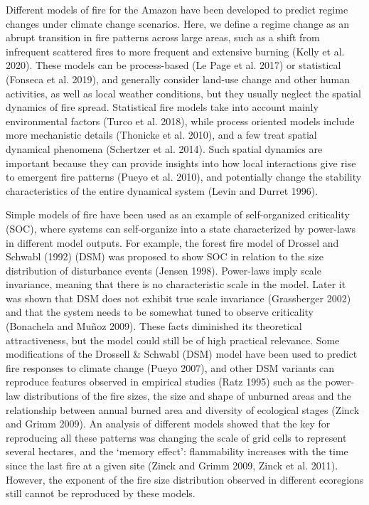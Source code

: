 \documentclass[
]{article}
\begin{document}
Different models of fire for the Amazon have been developed to predict
regime changes under climate change scenarios. Here, we define a regime
change as an abrupt transition in fire patterns across large areas, such
as a shift from infrequent scattered fires to more frequent and
extensive burning (Kelly et al. 2020). These models can be process-based
(Le Page et al. 2017) or statistical (Fonseca et al. 2019), and
generally consider land-use change and other human activities, as well
as local weather conditions, but they usually neglect the spatial
dynamics of fire spread. Statistical fire models take into account
mainly environmental factors (Turco et al. 2018), while process oriented
models include more mechanistic details (Thonicke et al. 2010), and a
few treat spatial dynamical phenomena (Schertzer et al. 2014). Such
spatial dynamics are important because they can provide insights into
how local interactions give rise to emergent fire patterns (Pueyo et al.
2010), and potentially change the stability characteristics of the
entire dynamical system (Levin and Durret 1996).

Simple models of fire have been used as an example of self-organized
criticality (SOC), where systems can self-organize into a state
characterized by power-laws in different model outputs. For example, the
forest fire model of Drossel and Schwabl (1992) (DSM) was proposed to
show SOC in relation to the size distribution of disturbance events
(Jensen 1998). Power-laws imply scale invariance, meaning that there is
no characteristic scale in the model. Later it was shown that DSM does
not exhibit true scale invariance (Grassberger 2002) and that the system
needs to be somewhat tuned to observe criticality (Bonachela and Muñoz
2009). These facts diminished its theoretical attractiveness, but the
model could still be of high practical relevance. Some modifications of
the Drossell \& Schwabl (DSM) model have been used to predict fire
responses to climate change (Pueyo 2007), and other DSM variants can
reproduce features observed in empirical studies (Ratz 1995) such as the
power-law distributions of the fire sizes, the size and shape of
unburned areas and the relationship between annual burned area and
diversity of ecological stages (Zinck and Grimm 2009). An analysis of
different models showed that the key for reproducing all these patterns
was changing the scale of grid cells to represent several hectares, and
the `memory effect': flammability increases with the time since the last
fire at a given site (Zinck and Grimm 2009, Zinck et al. 2011). However,
the exponent of the fire size distribution observed in different
ecoregions still cannot be reproduced by these models.
\end{document}
